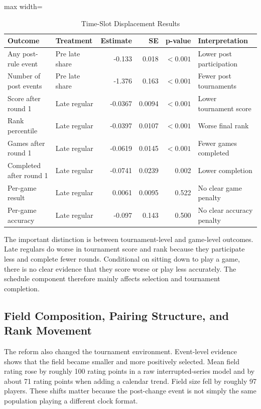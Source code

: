 \begin{table}[H]
\centering
\caption{Time-Slot Displacement Results}
\label{tab:timeslot}
\begin{adjustbox}{max width=\textwidth}
\begin{tabular}{llrrrl}
\toprule
Outcome & Treatment & Estimate & SE & p-value & Interpretation \\
\midrule
Any post-rule event & Pre late share & -0.133 & 0.018 & \(<0.001\) & Lower post participation \\
Number of post events & Pre late share & -1.376 & 0.163 & \(<0.001\) & Fewer post tournaments \\
Score after round 1 & Late regular & -0.0367 & 0.0094 & \(<0.001\) & Lower tournament score \\
Rank percentile & Late regular & -0.0397 & 0.0107 & \(<0.001\) & Worse final rank \\
Games after round 1 & Late regular & -0.0619 & 0.0145 & \(<0.001\) & Fewer games completed \\
Completed after round 1 & Late regular & -0.0741 & 0.0239 & 0.002 & Lower completion \\
Per-game result & Late regular & 0.0061 & 0.0095 & 0.522 & No clear game penalty \\
Per-game accuracy & Late regular & -0.097 & 0.143 & 0.500 & No clear accuracy penalty \\
\bottomrule
\end{tabular}
\end{adjustbox}
\end{table}

The important distinction is between tournament-level and game-level outcomes. Late regulars do worse in tournament score and rank because they participate less and complete fewer rounds. Conditional on sitting down to play a game, there is no clear evidence that they score worse or play less accurately. The schedule component therefore mainly affects selection and tournament completion.

\subsection{Field Composition, Pairing Structure, and Rank Movement}

The reform also changed the tournament environment. Event-level evidence shows that the field became smaller and more positively selected. Mean field rating rose by roughly 100 rating points in a raw interrupted-series model and by about 71 rating points when adding a calendar trend. Field size fell by roughly 97 players. These shifts matter because the post-change event is not simply the same population playing a different clock format.

